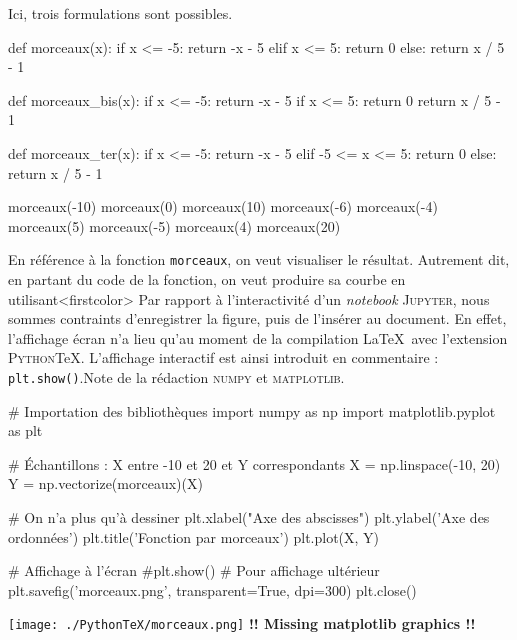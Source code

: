 \begin{solution}
Ici, trois formulations sont possibles.
\begin{idleconsole}
\begin{pyconsole}
def morceaux(x):
    if x <= -5:
        return -x - 5
    elif x <= 5:
        return 0
    else:
        return x / 5 - 1

def morceaux_bis(x):
    if x <= -5:
        return -x - 5
    if x <= 5:
        return 0
    return x / 5 - 1

def morceaux_ter(x):
    if x <= -5:
        return -x - 5
    elif -5 <= x <= 5:
        return 0
    else:
        return x / 5 - 1

morceaux(-10)
morceaux(0)
morceaux(10)
morceaux(-6)
morceaux(-4)
morceaux(5)
morceaux(-5)
morceaux(4)
morceaux(20)
\end{pyconsole}
\end{idleconsole}

En référence à la fonction \texttt{morceaux}, on veut visualiser le résultat. Autrement dit, en partant du code de la fonction, on veut produire sa courbe en utilisant\caution[t]<firstcolor>{%
Par rapport à l'interactivité d'un \textit{notebook} \textsc{Jupyter}, nous sommes contraints d'enregistrer la figure, puis de l'insérer au document. En effet, l'affichage écran n'a lieu qu'au moment de la compilation \LaTeX\ avec l’extension \textsc{Python}\TeX{}. L'affichage interactif est ainsi introduit en commentaire : \texttt{plt.show()}.}{Note de la rédaction}
 \textsc{numpy} et \textsc{matplotlib}. 

\begin{idleconsole}
\begin{pyconsole}
# Importation des bibliothèques
import numpy as np
import matplotlib.pyplot as plt

# Échantillons : X entre -10 et 20 et Y correspondants
X = np.linspace(-10, 20) 
Y = np.vectorize(morceaux)(X)

# On n'a plus qu'à dessiner
plt.xlabel("Axe des abscisses")
plt.ylabel('Axe des ordonnées')
plt.title('Fonction par morceaux')
plt.plot(X, Y)

# Affichage à l'écran
#plt.show() 
# Pour affichage ultérieur
plt.savefig('morceaux.png', transparent=True, dpi=300)
plt.close()
\end{pyconsole}
\end{idleconsole}


\begin{center}
\vspace{-\baselineskip}
%
  {\texttt{[image: ./PythonTeX/morceaux.png]}}%
  {\textbf{!! Missing matplotlib graphics !!}}%
\end{center}
\vspace{-.5\baselineskip}
\end{solution}

